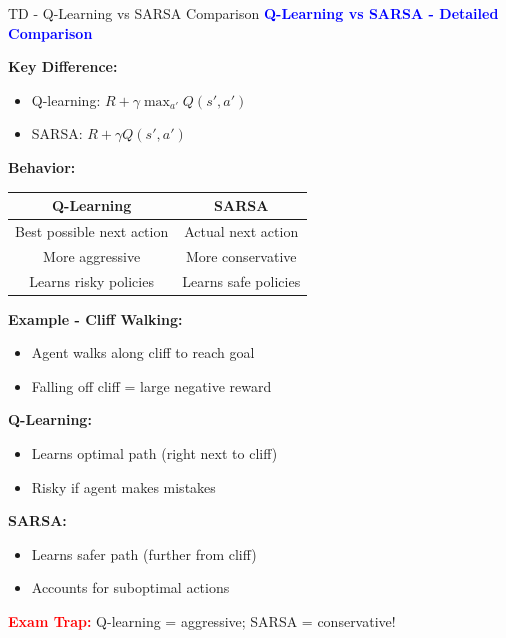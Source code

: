 \documentclass[8pt]{beamer}
\begin{document}
	\begin{frame}{TD - Q-Learning vs SARSA Comparison}
		\fontsize{6.5}{7.5}\selectfont
		\textcolor{blue}{\textbf{Q-Learning vs SARSA - Detailed Comparison}}
		
		\textbf{Key Difference:}
		\begin{itemize}
			\item Q-learning: $R + \gamma \max_{a'} Q(s',a')$
			\item SARSA: $R + \gamma Q(s',a')$
		\end{itemize}
		
		\textbf{Behavior:}
		\begin{tabular}{|c|c|}
			\hline
			Q-Learning & SARSA \\
			\hline
			Best possible next action & Actual next action \\
			\hline
			More aggressive & More conservative \\
			\hline
			Learns risky policies & Learns safe policies \\
			\hline
		\end{tabular}
		
		\textbf{Example - Cliff Walking:}
		\begin{itemize}
			\item Agent walks along cliff to reach goal
			\item Falling off cliff = large negative reward
		\end{itemize}
		
		\textbf{Q-Learning:}
		\begin{itemize}
			\item Learns optimal path (right next to cliff)
			\item Risky if agent makes mistakes
		\end{itemize}
		
		\textbf{SARSA:}
		\begin{itemize}
			\item Learns safer path (further from cliff)
			\item Accounts for suboptimal actions
		\end{itemize}
		
		\textcolor{red}{\textbf{Exam Trap:}} Q-learning = aggressive; SARSA = conservative!
	\end{frame}
	
\end{document}
